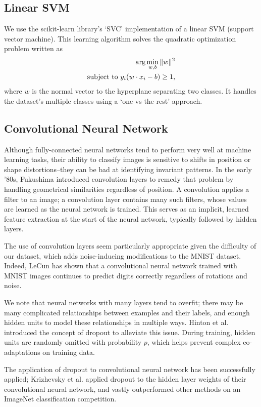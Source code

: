 \documentclass{acm_proc_article-sp}
\begin{document}
\subsection{Linear SVM}
We use the scikit-learn \cite{scikit-learn} library's `SVC' implementation of a linear SVM (support vector machine). This learning algorithm solves the quadratic optimization problem written as
\begin{align*} 
\hbox{arg} \min_{w,b} \|w\|^2 \\
\hbox{subject to } y_i(w \cdot x_i - b) \geq 1,
\end{align*}
where $w$ is the normal vector to the hyperplane separating two classes. It handles the dataset's multiple classes using a `one-vs-the-rest' approach.

\subsection{Convolutional Neural Network}
Although fully-connected neural networks tend to perform very well at machine learning tasks, their ability to classify images is sensitive to shifts in position or shape distortions--they can be bad at identifying invariant patterns. In the early '80s, Fukushima introduced convolution layers to remedy that problem by handling geometrical similarities regardless of position.\cite{Fukushima} A convolution applies a filter to an image; a convolution layer contains many such filters, whose values are learned as the neural network is trained. This serves as an implicit, learned feature extraction at the start of the neural network, typically followed by hidden layers.

The use of convolution layers seem particularly appropriate given the difficulty of our dataset, which adds noise-inducing modifications to the MNIST dataset. Indeed, LeCun has shown that a convolutional neural network trained with MNIST images continues to predict digits correctly regardless of rotations and noise.\cite{LeCun}

We note that neural networks with many layers tend to overfit; there may be many complicated relationships between examples and their labels, and enough hidden units to model these relationships in multiple ways. Hinton et al.\cite{Hinton} introduced the concept of dropout to alleviate this issue. During training, hidden units are randomly omitted with probability $p$, which helps prevent complex co-adaptations on training data. 

The application of dropout to convolutional neural network has been successfully applied; Krizhevsky et al. applied dropout to the hidden layer weights of their convolutional neural network, and vastly outperformed other methods on an ImageNet classification competition.\cite{Krizhevsky} 
\end{document}

